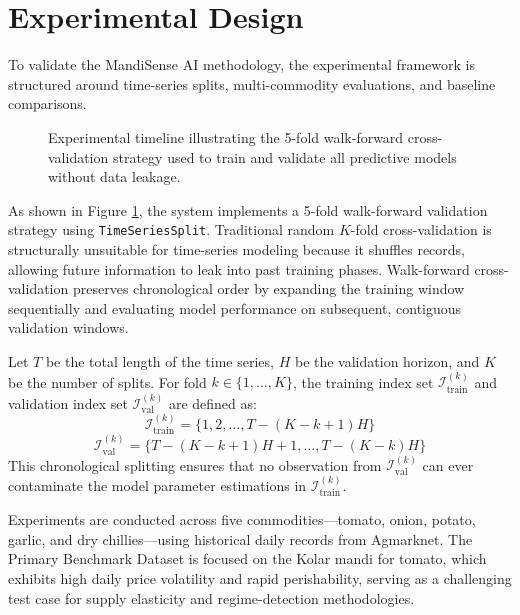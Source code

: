 \documentclass[12pt,a4paper]{report}
\theoremstyle{definition}
\theoremstyle{remark}
\begin{document}
\section{Experimental Design}

To validate the MandiSense AI methodology, the experimental framework is structured around time-series splits, multi-commodity evaluations, and baseline comparisons.

\begin{figure}[htbp]
    \centering
    \caption{Experimental timeline illustrating the 5-fold walk-forward cross-validation strategy used to train and validate all predictive models without data leakage.}
    \label{fig:validation_splits}
\end{figure}

As shown in Figure \ref{fig:validation_splits}, the system implements a 5-fold walk-forward validation strategy using \texttt{TimeSeriesSplit}. Traditional random $K$-fold cross-validation is structurally unsuitable for time-series modeling because it shuffles records, allowing future information to leak into past training phases. Walk-forward cross-validation preserves chronological order by expanding the training window sequentially and evaluating model performance on subsequent, contiguous validation windows.

Let $T$ be the total length of the time series, $H$ be the validation horizon, and $K$ be the number of splits. For fold $k \in \{1, \dots, K\}$, the training index set $\mathcal{I}_{\text{train}}^{(k)}$ and validation index set $\mathcal{I}_{\text{val}}^{(k)}$ are defined as:
\begin{equation}
    \mathcal{I}_{\text{train}}^{(k)} = \{ 1, 2, \dots, T - (K - k + 1)H \}
\end{equation}
\begin{equation}
    \mathcal{I}_{\text{val}}^{(k)} = \{ T - (K - k + 1)H + 1, \dots, T - (K - k)H \}
\end{equation}
This chronological splitting ensures that no observation from $\mathcal{I}_{\text{val}}^{(k)}$ can ever contaminate the model parameter estimations in $\mathcal{I}_{\text{train}}^{(k)}$.

Experiments are conducted across five commodities—tomato, onion, potato, garlic, and dry chillies—using historical daily records from Agmarknet. The Primary Benchmark Dataset is focused on the Kolar mandi for tomato, which exhibits high daily price volatility and rapid perishability, serving as a challenging test case for supply elasticity and regime-detection methodologies.
\end{document}
